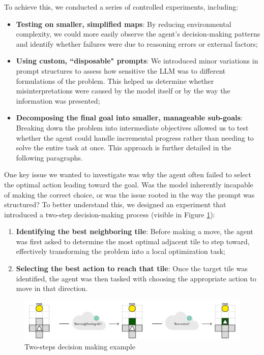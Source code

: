 To achieve this, we conducted a series of controlled experiments, including:
\begin{itemize}
  \item \textbf{Testing on smaller, simplified maps}: By reducing environmental complexity,
    we could more easily observe the agent's decision-making patterns and
    identify whether failures were due to reasoning errors or external factors;

  \item \textbf{Using custom, ``disposable" prompts}: We introduced minor variations
    in prompt structures to assess how sensitive the LLM was to different formulations
    of the problem. This helped us determine whether misinterpretations were
    caused by the model itself or by the way the information was presented;

  \item \textbf{Decomposing the final goal into smaller, manageable sub-goals}: Breaking
    down the problem into intermediate objectives allowed us to test whether the
    agent could handle incremental progress rather than needing to solve the entire
    task at once. This approach is further detailed in the following paragraphs.
\end{itemize}

One key issue we wanted to investigate was why the agent often failed to select
the optimal action leading toward the goal. Was the model inherently incapable of
making the correct choice, or was the issue rooted in the way the prompt was
structured? To better understand this, we designed an experiment that introduced
a two-step decision-making process (visible in Figure \ref{fig:extra}):
\begin{enumerate}
  \item \textbf{Identifying the best neighboring tile}: Before making a move,
    the agent was first asked to determine the most optimal adjacent tile to
    step toward, effectively transforming the problem into a local optimization task;

  \item \textbf{Selecting the best action to reach that tile}: Once the target tile
    was identified, the agent was then tasked with choosing the appropriate
    action to move in that direction.
\end{enumerate}

\vspace{7mm}
\begin{figure}[h!]
  \centering
  \includegraphics[width=\textwidth]{images/agent_development/extra.pdf}
  \caption{Two-steps decision making example}
  \label{fig:extra}
\end{figure}
\vspace{7mm}

